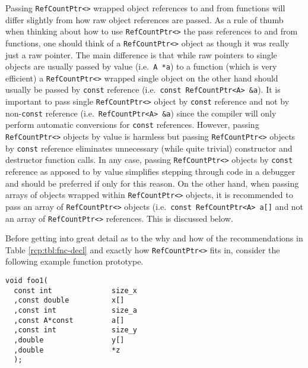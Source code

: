 Passing {}\texttt{Ref\-Count\-Ptr<>} wrapped object references to and
from functions will differ slightly from how raw object references are
passed.  As a rule of thumb when thinking about how to use
{}\texttt{Ref\-Count\-Ptr<>} the pass references to and from
functions, one should think of a {}\texttt{Ref\-Count\-Ptr<>} object
as though it was really just a raw pointer.  The main difference is
that while raw pointers to single objects are usually passed by value
(i.e.~{}\texttt{A *a}) to a function (which is very efficient) a
{}\texttt{Ref\-Count\-Ptr<>} wrapped single object on the other hand
should usually be passed by {}\texttt{const} reference
(i.e.~{}\texttt{const Ref\-Count\-Ptr<A> \&a}).  It is important to
pass single {}\texttt{Ref\-Count\-Ptr<>} object by {}\texttt{const}
reference and not by non-{}\texttt{const} reference
(i.e.~{}\texttt{Ref\-Count\-Ptr<A> \&a}) since the compiler will only
perform automatic conversions for {}\texttt{const} references.
However, passing {}\texttt{Ref\-Count\-Ptr<>} objects by value is
harmless but passing {}\texttt{Ref\-Count\-Ptr<>} objects by
{}\texttt{const} reference eliminates unnecessary (while quite trivial)
constructor and destructor function calls.  In any case, passing
{}\texttt{Ref\-Count\-Ptr<>} objects by {}\texttt{const} reference as
apposed to by value simplifies stepping through code in a debugger and
should be preferred if only for this reason.  On the other hand, when
passing arrays of objects wrapped within {}\texttt{Ref\-Count\-Ptr<>}
objects, it is recommended to pass an array of
{}\texttt{Ref\-Count\-Ptr<>} objects (i.e.~{}\texttt{const
Ref\-Count\-Ptr<A> a[]} and not an array of
{}\texttt{Ref\-Count\-Ptr<>} references.  This is discussed below.

Before getting into great detail as to the why and how of the
recommendations in Table {}\ref{rcp:tbl:fnc-decl} and exactly how
{}\texttt{Ref\-Count\-Ptr<>} fits in, consider the following example
function prototype.

{\scriptsize\begin{verbatim}
void foo1(
  const int              size_x
  ,const double          x[]
  ,const int             size_a
  ,const A*const         a[]
  ,const int             size_y
  ,double                y[]
  ,double                *z
  );
\end{verbatim}}

